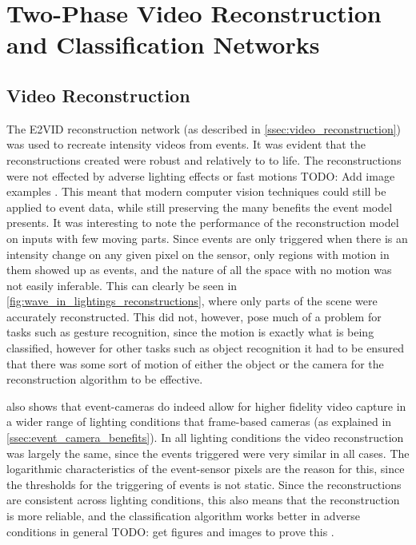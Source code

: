 \section{Two-Phase Video Reconstruction and Classification Networks}

\subsection{Video Reconstruction}

The E2VID reconstruction network (as described in \cref{ssec:video_reconstruction}) was used to recreate intensity videos from events. It was evident that the reconstructions created were robust and relatively to to life. The reconstructions were not effected by adverse lighting effects or fast motions \color{red} TODO: Add image examples \color{black}. This meant that modern computer vision techniques could still be applied to event data, while still preserving the many benefits the event model presents. It was interesting to note the performance of the reconstruction model on inputs with few moving parts. Since events are only triggered when there is an intensity change on any given pixel on the sensor, only regions with motion in them showed up as events, and the nature of all the space with no motion was not easily inferable. This can clearly be seen in \cref{fig:wave_in_lightings_reconstructions}, where only parts of the scene were accurately reconstructed. This did not, however, pose much of a problem for tasks such as gesture recognition, since the motion is exactly what is being classified, however for other tasks such as object recognition it had to be ensured that there was some sort of motion of either the object or the camera for the reconstruction algorithm to be effective.

 also shows that event-cameras do indeed allow for higher fidelity video capture in a wider range of lighting conditions that frame-based cameras (as explained in \cref{ssec:event_camera_benefits}). In all lighting conditions the video reconstruction was largely the same, since the events triggered were very similar in all cases. The logarithmic characteristics of the event-sensor pixels are the reason for this, since the thresholds for the triggering of events is not static. Since the reconstructions are consistent across lighting conditions, this also means that the reconstruction is more reliable, and the classification algorithm works better in adverse conditions in general \color{red} TODO: get figures and images to prove this \color{black}.

